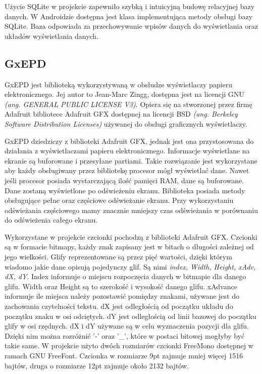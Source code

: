 \documentclass[a4paper,12pt, twoside]{article}
\begin{document}
    	Użycie SQLite w projekcie zapewniło szybką i intuicyjną budowę relacyjnej bazy danych. W Androidzie dostępna jest klasa implementująca metody obsługi bazy SQLite. Baza odpowiada za przechowywanie wpisów danych do wyświetlania oraz układów wyświetlania danych. 
    	
    	\subsection{GxEPD}\label{GxEPD}
    	GxEPD jest biblioteką wykorzystywaną w obsłudze wyświetlaczy papieru elektronicznego. Jej autor to Jean-Marc Zingg, dostępna jest na licencji GNU \textit{(ang. GENERAL PUBLIC LICENSE V3)}. Opiera się na stworzonej przez firmę Adafruit bibliotece Adafruit GFX dostępnej na licencji BSD \textit{(ang. Berkeley Software Distribution Licenses)} używanej do obsługi graficznych wyświetlaczy.
    	
    	GxEPD dziedziczy z biblioteki Adafruit GFX, jednak jest ona przystosowana do działania z wyświetlaczami papieru elektronicznego. Informacje wyświetlane na ekranie są buforowane i przesyłane partiami. Takie rozwiązanie jest wykorzystane aby każdy obsługiwany przez bibliotekę procesor mógł wyświetlać dane. Nawet jeśli procesor posiada wystarczającą ilość pamięci RAM, dane są buforowane. Dane zostaną wyświetlone po odświeżeniu ekranu. Biblioteka posiada metody obsługujące pełne oraz częściowe odświeżanie ekranu. Przy wykorzystaniu odświeżania częściowego mamy znacznie mniejszy czas odświeżania w porównaniu do odświeżenia całego ekranu.
    	
        Wykorzystane w projekcie czcionki pochodzą z biblioteki Adafruit GFX. Czcionki są w formacie bitmapy, każdy znak zapisany jest w bitach o długości zależnej od jego wielkości. Glify reprezentowane są przez pięć wartości, dzięki którym wiadomo jakie dane opisują pojedynczy glif. Są nimi \textit{index,  Width, Height, xAdv, dX, dY}. Index informuje o miejscu rozpoczęcia danych w bitmapie dla danego glifu. Width oraz Height są to szerokość i wysokość danego glifu. xAdvance informuje ile miejsca należy pozostawić pomiędzy znakami, używane jest do zachowania czytelności tekstu. dX jest odległością od początku układu do początku znaku w osi odciętych. dY jest odległością od linii bazowej do początku glify w osi rzędnych. dX i dY używane są w celu wyznaczenia pozycji dla glifu. Dzięki nim można rozróżnić '-' oraz '\_', które w postaci bitowej mogłyby być takie same. W projekcie użyto dwóch rozmiarów czcionki FreeMono dostępnej w ramach GNU FreeFont. Czcionka w rozmiarze 9pt zajmuje mniej więcej 1516 bajtów, druga o rozmiarze 12pt zajmuje około 2132 bajtów.
        
\end{document}
